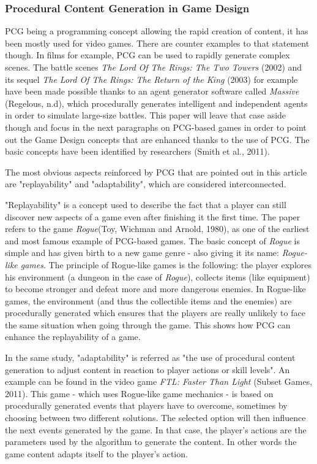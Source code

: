 \subsubsection{Procedural Content Generation in Game Design}
PCG being a programming concept allowing the rapid creation of content, it has been mostly used for video games. There are counter examples to that statement though. In films for example, PCG can be used to rapidly generate complex scenes. The battle scenes \textit{The Lord Of The Rings: The Two Towers} (2002)\cite{film:lotr2} and its sequel \textit{The Lord Of The Rings: The Return of the King} (2003)\cite{film:lotr3} for example have been made possible thanks to an agent generator software called \textit{Massive} (Regelous, n.d)\cite{soft:massive}, which procedurally generates intelligent and independent agents in order to simulate large-size battles. This paper will leave that case aside though and focus in the next paragraphs on PCG-based games in order to point out the Game Design concepts that are enhanced thanks to the use of PCG. The basic concepts have been identified by researchers (Smith et al., 2011)\cite{art:pcgbased}.

The most obvious aspects reinforced by PCG that are pointed out in this article are "replayability" and "adaptability", which are considered interconnected.

"Replayability" is a concept used to describe the fact that a player can still discover new aspects of a game even after finishing it the first time. The paper refers to the game \textit{Rogue}(Toy, Wichman and Arnold, 1980)\cite{game:rogue}, as one of the earliest and most famous example of PCG-based games. The basic concept of \textit{Rogue} is simple and has given birth to a new game genre - also giving it its name: \textit{Rogue-like games}. The principle of Rogue-like games is the following: the player explores his environment (a dungeon in the case of \textit{Rogue}), collects items (like equipment) to become stronger and defeat more and more dangerous enemies. In Rogue-like games, the environment (and thus the collectible items and the enemies) are procedurally generated which ensures that the players are really unlikely to face the same situation when going through the game. This shows how PCG can enhance the replayability of a game.

In the same study, "adaptability" is referred as "the use of procedural content generation to adjust content in reaction to player actions or skill levels". An example can be found in the video game \textit{FTL: Faster Than Light} (Subset Games, 2011)\cite{game:ftl}. This game - which uses Rogue-like game mechanics - is based on procedurally generated events that players   have to overcome, sometimes by choosing between two different solutions. The selected option will then influence the next events generated by the game. In that case, the player's actions are the parameters used by the algorithm to generate the content. In other words the game content adapts itself to the player's action.

